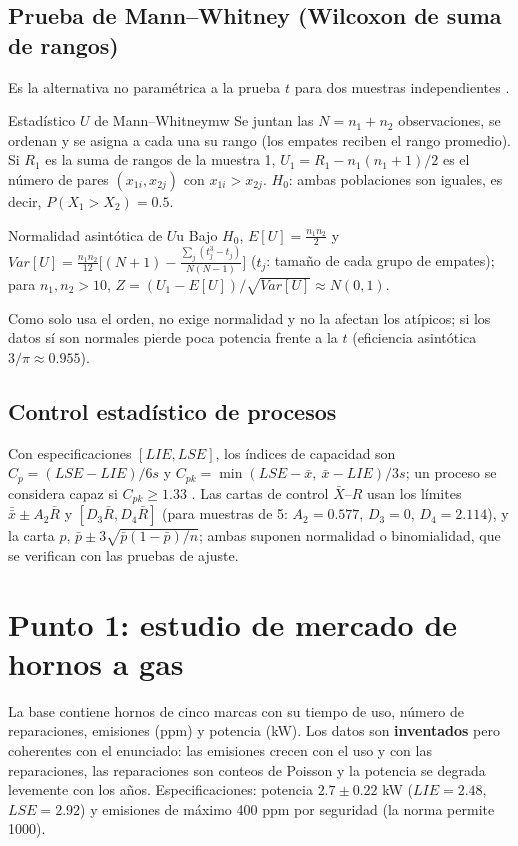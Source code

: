 \documentclass[11pt]{article}
\begin{document}
\subsection{Prueba de Mann–Whitney (Wilcoxon de suma de rangos)}
Es la alternativa no paramétrica a la prueba $t$ para dos muestras independientes \cite{mannwhitney,wilcoxon}.
\begin{definicion}{Estadístico $U$ de Mann–Whitney}{mw}
Se juntan las $N=n_1+n_2$ observaciones, se ordenan y se asigna a cada una su rango (los empates reciben el rango
promedio). Si $R_1$ es la suma de rangos de la muestra 1, $U_1=R_1-n_1(n_1+1)/2$ es el número de pares
$(x_{1i},x_{2j})$ con $x_{1i}>x_{2j}$. $H_0$: ambas poblaciones son iguales, es decir, $P(X_1>X_2)=0.5$.
\end{definicion}
\begin{teorema}{Normalidad asintótica de $U$}{u}
Bajo $H_0$, $E[U]=\frac{n_1n_2}{2}$ y $Var[U]=\frac{n_1n_2}{12}\Big[(N+1)-\frac{\sum_j(t_j^3-t_j)}{N(N-1)}\Big]$
($t_j$: tamaño de cada grupo de empates); para $n_1,n_2>10$, $Z=(U_1-E[U])/\sqrt{Var[U]}\approx N(0,1)$.
\end{teorema}
Como solo usa el orden, no exige normalidad y no la afectan los atípicos; si los datos sí son normales pierde poca
potencia frente a la $t$ (eficiencia asintótica $3/\pi\approx0.955$).

\subsection{Control estadístico de procesos}
Con especificaciones $[LIE,LSE]$, los índices de capacidad son $C_p=(LSE-LIE)/6s$ y
$C_{pk}=\min(LSE-\bar x,\ \bar x-LIE)/3s$; un proceso se considera capaz si $C_{pk}\ge1.33$ \cite{montgomeryqc}.
Las cartas de control $\bar X$–$R$ usan los límites $\bar{\bar x}\pm A_2\bar R$ y $[D_3\bar R,D_4\bar R]$ (para
muestras de 5: $A_2=0.577$, $D_3=0$, $D_4=2.114$), y la carta $p$, $\bar p\pm3\sqrt{\bar p(1-\bar p)/n}$; ambas
suponen normalidad o binomialidad, que se verifican con las pruebas de ajuste.

\section{Punto 1: estudio de mercado de hornos a gas}\label{sec:p1}
La base contiene \nHornos{} hornos de cinco marcas con su tiempo de uso, número de reparaciones, emisiones (ppm) y
potencia (kW). Los datos son \textbf{inventados} pero coherentes con el enunciado: las emisiones crecen con el uso
y con las reparaciones, las reparaciones son conteos de Poisson y la potencia se degrada levemente con los años.
Especificaciones: potencia $2.7\pm0.22$ kW ($LIE=2.48$, $LSE=2.92$) y emisiones de máximo 400 ppm por seguridad
(la norma permite 1000).
\end{document}
